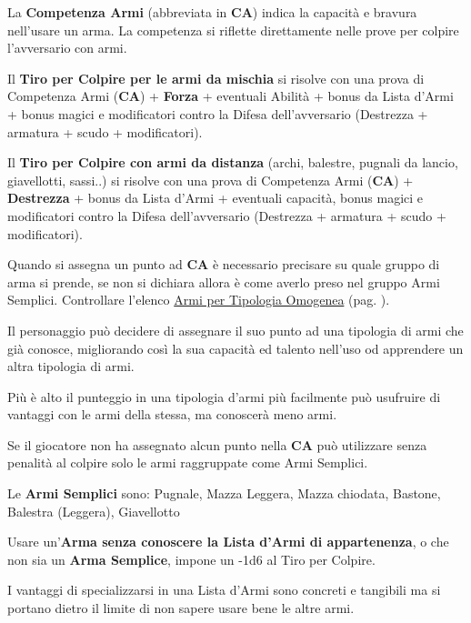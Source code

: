 \begin{multicols}{2}
La \textbf{Competenza Armi} (abbreviata in \textbf{CA}) indica la capacità e bravura nell'usare un arma. La competenza si riflette direttamente nelle prove per colpire l'avversario con armi.

Il \textbf{Tiro per Colpire per le armi da mischia} si risolve con una prova di Competenza Armi (\textbf{CA}) + \textbf{Forza} + eventuali Abilità + bonus da Lista d'Armi + bonus magici e modificatori contro la Difesa dell'avversario (Destrezza + armatura + scudo + modificatori).

Il \textbf{Tiro per Colpire con armi da distanza} (archi, balestre, pugnali da lancio, giavellotti, sassi..) si risolve con una prova di Competenza Armi (\textbf{CA}) + \textbf{Destrezza} + bonus da Lista d'Armi + eventuali capacità, bonus magici e modificatori contro la Difesa dell'avversario (Destrezza + armatura + scudo + modificatori).

Quando si assegna un punto ad \textbf{CA} è necessario precisare su quale gruppo di arma si prende, se non si dichiara allora è come averlo preso nel gruppo Armi Semplici.
Controllare l'elenco \hyperlink{lista.armi}{Armi per Tipologia Omogenea} (pag. \pageref{lista.armi}).

Il personaggio può decidere di assegnare il suo punto ad una tipologia di armi che già conosce, migliorando così la sua capacità ed talento nell'uso od apprendere un altra tipologia di armi.

Più è alto il punteggio in una tipologia d'armi più facilmente può usufruire di vantaggi con le armi della stessa, ma conoscerà meno armi.

Se il giocatore non ha assegnato alcun punto nella \textbf{CA} può utilizzare senza penalità al colpire solo le armi raggruppate come Armi Semplici.

Le \textbf{Armi Semplici} sono: Pugnale, Mazza Leggera, Mazza chiodata, Bastone, Balestra (Leggera), Giavellotto

Usare un'\textbf{Arma senza conoscere la Lista d'Armi di appartenenza}, o che non sia un \textbf{Arma Semplice}, impone un -1d6 al Tiro per Colpire.

\begin{changemargin}{0.3cm}{0.3cm}\begin{tcolorbox}[title = Specializzarsi o meno in un arma]
I vantaggi di specializzarsi in una Lista d'Armi sono concreti e tangibili ma si portano dietro il limite di non sapere usare bene le altre armi.


\end{tcolorbox}
\end{changemargin}
\end{multicols}
